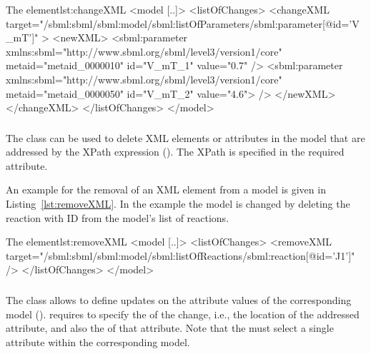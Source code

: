 \begin{myXmlLst}{The  element}{lst:changeXML}
<model [..]>
	<listOfChanges>
		<changeXML target="/sbml:sbml/sbml:model/sbml:listOfParameters/sbml:parameter[@id='V_mT']" >
			<newXML>
				<sbml:parameter xmlns:sbml="http://www.sbml.org/sbml/level3/version1/core"
				                metaid="metaid_0000010" id="V_mT_1" value="0.7" />
				<sbml:parameter xmlns:sbml="http://www.sbml.org/sbml/level3/version1/core"
				                metaid="metaid_0000050" id="V_mT_2" value="4.6"> />
			</newXML>
		</changeXML>
	</listOfChanges>
</model>
\end{myXmlLst}


\subsubsection{}
\label{class:removeXml}
The  class can be used to delete  XML elements or attributes in the model that are addressed by the XPath expression (). The XPath is specified in the required \hyperref[sec:changeTarget]{} attribute.

An example for the removal of an XML element from a model is given in Listing~\ref{lst:removeXML}. In the example the model is changed by deleting the reaction with ID  from the model's list of reactions.

\begin{myXmlLst}{The  element}{lst:removeXML}
<model [..]>
	<listOfChanges>
		<removeXML target="/sbml:sbml/sbml:model/sbml:listOfReactions/sbml:reaction[@id='J1']" />
	</listOfChanges>
</model>
\end{myXmlLst}


\subsubsection{}
\label{class:changeAttribute}
The  class allows to define updates on the attribute values of the corresponding model ().  requires to specify the \hyperref[sec:changeTarget]{} of the change, i.e., the location of the addressed attribute, and also the \hyperref[sec:newValue]{} of that attribute. Note that the \hyperref[sec:changeTarget]{} must select a single attribute within the corresponding model.

